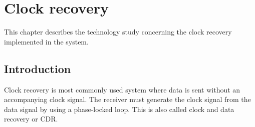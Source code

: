 \chapter{Clock recovery}
This chapter describes the technology study concerning the clock recovery implemented in the system.
\section{Introduction}
Clock recovery is most commonly used system where data is sent without an accompanying clock signal. The receiver must generate the clock signal from the data signal by using a phase-locked loop. This is also called clock and data recovery or CDR.
